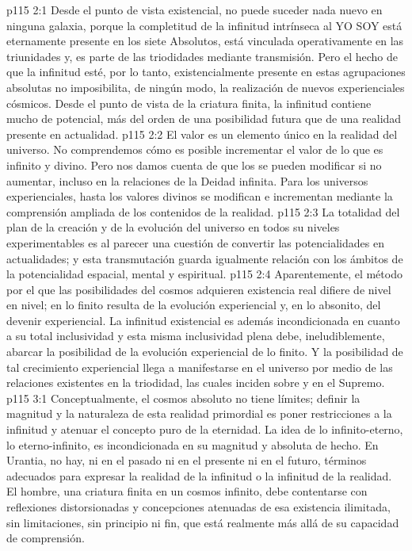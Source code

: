\vs p115 2:1 Desde el punto de vista existencial, no puede suceder nada nuevo en ninguna galaxia, porque la completitud de la infinitud intrínseca al YO SOY está eternamente presente en los siete Absolutos, está vinculada operativamente en las triunidades y, es parte de las triodidades mediante transmisión. Pero el hecho de que la infinitud esté, por lo tanto, existencialmente presente en estas agrupaciones absolutas no imposibilita, de ningún modo, la realización de nuevos experienciales cósmicos. Desde el punto de vista de la criatura finita, la infinitud contiene mucho de potencial, más del orden de una posibilidad futura que de una realidad presente en actualidad.
\vs p115 2:2 El valor es un elemento único en la realidad del universo. No comprendemos cómo es posible incrementar el valor de lo que es infinito y divino. Pero nos damos cuenta de que los  se pueden modificar si no aumentar, incluso en la relaciones de la Deidad infinita. Para los universos experienciales, hasta los valores divinos se modifican e incrementan mediante la comprensión ampliada de los contenidos de la realidad.
\vs p115 2:3 La totalidad del plan de la creación y de la evolución del universo en todos su niveles experimentables es al parecer una cuestión de convertir las potencialidades en actualidades; y esta transmutación guarda igualmente relación con los ámbitos de la potencialidad espacial, mental y espiritual.
\vs p115 2:4 Aparentemente, el método por el que las posibilidades del cosmos adquieren existencia real difiere de nivel en nivel; en lo finito resulta de la evolución experiencial y, en lo absonito, del devenir experiencial. La infinitud existencial es además incondicionada en cuanto a su total inclusividad y esta misma inclusividad plena debe, ineludiblemente, abarcar la posibilidad de la evolución experiencial de lo finito. Y la posibilidad de tal crecimiento experiencial llega a manifestarse en el universo por medio de las relaciones existentes en la triodidad, las cuales inciden sobre y en el Supremo.
\vs p115 3:1 Conceptualmente, el cosmos absoluto no tiene límites; definir la magnitud y la naturaleza de esta realidad primordial es poner restricciones a la infinitud y atenuar el concepto puro de la eternidad. La idea de lo infinito\hyp{}eterno, lo eterno\hyp{}infinito, es incondicionada en su magnitud y absoluta de hecho. En Urantia, no hay, ni en el pasado ni en el presente ni en el futuro, términos adecuados para expresar la realidad de la infinitud o la infinitud de la realidad. El hombre, una criatura finita en un cosmos infinito, debe contentarse con reflexiones distorsionadas y concepciones atenuadas de esa existencia ilimitada, sin limitaciones, sin principio ni fin, que está realmente más allá de su capacidad de comprensión.
